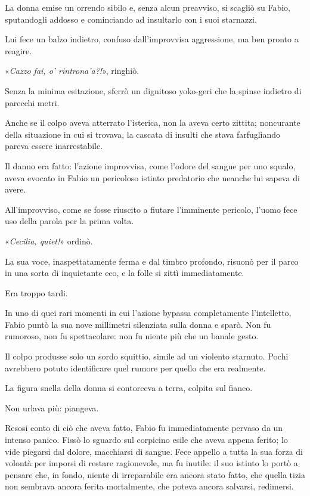 La donna emise un orrendo sibilo e, senza alcun preavviso, si scagliò su Fabio, sputandogli addosso e cominciando ad insultarlo con i suoi starnazzi. 

Lui fece un balzo indietro, confuso dall'improvvisa aggressione, ma ben pronto a reagire.

«\textit{Cazzo fai, o' rintrona'a?!}», ringhiò. 

Senza la minima esitazione, sferrò un dignitoso yoko-geri che la spinse indietro di parecchi metri.

Anche se il colpo aveva atterrato l'isterica, non la aveva certo zittita; noncurante della situazione in cui si trovava, la cascata di insulti che stava farfugliando pareva essere inarrestabile.

Il danno era fatto: l'azione improvvisa, come l'odore del sangue per uno squalo, aveva evocato in Fabio un pericoloso istinto predatorio che neanche lui sapeva di avere.

All'improvviso, come se fosse riuscito a fiutare l'imminente pericolo, l'uomo fece uso della parola per la prima volta.

«\textit{Cecilia, quiet!}» ordinò. 

La sua voce, inaspettatamente ferma e dal timbro profondo, risuonò per il parco in una sorta di inquietante eco, e la folle si zittì immediatamente.  

Era troppo tardi.

In uno di quei rari momenti in cui l'azione bypassa completamente l'intelletto, Fabio puntò la sua nove millimetri silenziata sulla donna e sparò. Non fu rumoroso, non fu spettacolare: non fu niente più che un banale gesto.

Il colpo produsse solo un sordo squittio, simile ad un violento starnuto. Pochi avrebbero potuto identificare quel rumore per quello che era realmente.

La figura snella della donna si contorceva a terra, colpita sul fianco.

Non urlava più: piangeva.

Resosi conto di ciò che aveva fatto, Fabio fu immediatamente pervaso da un intenso panico. Fissò lo sguardo sul corpicino esile che aveva appena ferito; lo vide piegarsi dal dolore, macchiarsi di sangue. Fece appello a tutta la sua forza di volontà per imporsi di restare ragionevole, ma fu inutile: il suo istinto lo portò a pensare che, in fondo, niente di irreparabile era ancora stato fatto, che quella tizia non sembrava ancora ferita mortalmente, che poteva ancora salvarsi, redimersi. 


